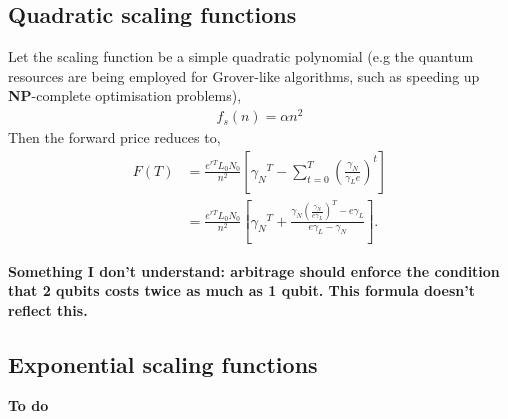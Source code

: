 \documentclass[aps,pra,twocolumn,amsmath,amssymb,nofootinbib,superscriptaddress]{revtex4}
\begin{document}
\subsection{Quadratic scaling functions}

Let the scaling function be a simple quadratic polynomial (e.g the quantum resources are being employed for Grover-like algorithms, such as speeding up \textbf{NP}-complete optimisation problems),
\begin{align}
f_s(n) = \alpha n^2	
\end{align}
Then the forward price reduces to,
\begin{align}
F(T) &= \frac{e^{rT}L_0N_0}{n^2} \left[{\gamma_N}^{T} - \sum_{t=0}^{T} \left(\frac{\gamma_N}{\gamma_L e}\right)^t \right] \nonumber \\
&= \frac{e^{rT}L_0 N_0}{n^2} \left[{\gamma_N}^T + \frac{\gamma_N\left(\frac{\gamma_N}{e \gamma_L}\right)^T-e\gamma_L}{e\gamma_L - \gamma_N} \right].
\end{align}

\textbf{Something I don't understand: arbitrage should enforce the condition that 2 qubits costs twice as much as 1 qubit. This formula doesn't reflect this.}

\subsection{Exponential scaling functions}

\textbf{To do}
\end{document}
